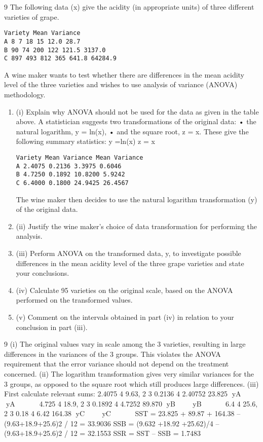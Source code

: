 \documentclass[a4paper,12pt]{article}
\begin{document}
\begin{enumerate}
9 The following data (x) give the acidity (in appropriate units) of three different
varieties of grape.
\begin{verbatim}
Variety Mean Variance
A 8 7 18 15 12.0 28.7
B 90 74 200 122 121.5 3137.0
C 897 493 812 365 641.8 64284.9
\end{verbatim}
A wine maker wants to test whether there are differences in the mean acidity level of
the three varieties and wishes to use analysis of variance (ANOVA) methodology.
\begin{enumerate}
    \item 

(i) Explain why ANOVA should not be used for the data as given in the table
above. 
A statistician suggests two transformations of the original data:
  • the natural logarithm, y = ln(x),
• and the square root, z = x.
These give the following summary statistics:
  y =ln(x) z = x
 \begin{verbatim}
Variety Mean Variance Mean Variance
A 2.4075 0.2136 3.3975 0.6046
B 4.7250 0.1892 10.8200 5.9242
C 6.4000 0.1800 24.9425 26.4567
 \end{verbatim}

The wine maker then decides to use the natural logarithm transformation (y) of the
original data.
\item (ii) Justify the wine maker’s choice of data transformation for performing the
analysis. 
\item (iii) Perform ANOVA on the transformed data, y, to investigate possible
differences in the mean acidity level of the three grape varieties and state your
conclusions. 
\item (iv) Calculate 95%
varieties on the original scale, based on the ANOVA performed on the
transformed values. 
\item (v) Comment on the intervals obtained in part (iv) in relation to your conclusion
in part (iii). 
\end{enumerate}
\newpage

9 (i) The original values vary in scale among the 3 varieties, resulting in large
differences in the variances of the 3 groups. This violates the ANOVA
requirement that the error variance should not depend on the treatment
concerned. 
(ii) The logarithm transformation gives very similar variances for the 3 groups, as opposed to the square root which still produces large differences. 
(iii) First calculate relevant sums:
  2.4075 4 9.63, 2 3 0.2136 4 2.40752 23.825 yA    yA     
4.725 4 18.9, 2 3 0.1892 4 4.7252 89.870 yB    yB     
6.4 4 25.6, 2 3 0.18 4 6.42 164.38 yC    yC     
SST = 23.825 + 89.87 + 164.38 – (9.63+18.9+25.6)2 / 12 = 33.9036
SSB = (9.632 +18.92 +25.62)/4 – (9.63+18.9+25.6)2 / 12 = 32.1553
SSR = SST – SSB = 1.7483


\end{enumerate}
\end{document}
